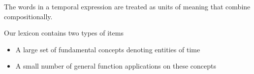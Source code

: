 



The words in a temporal expression are treated as units of meaning that
	combine compositionally.

Our lexicon contains two types of items
\begin{itemize}
	\item A large set of fundamental concepts denoting entities of time
	\item A small number of general function applications on these concepts
\end{itemize}
\dome
